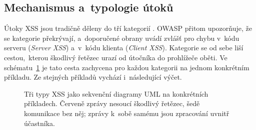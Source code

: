 \subsection{Mechanismus a~typologie útoků}

Útoky XSS jsou tradičně děleny do tří kategorií \parencite{owaspTypesXSS}. OWASP přitom upozorňuje, že se kategorie překrývají, a~doporučené obrany uvádí zvlášť pro chybu v~kódu serveru (\emph{Server XSS}) a~v~kódu klienta (\emph{Client XSS}). Kategorie se od sebe liší cestou,~kterou škodlivý řetězec urazí od útočníka do prohlížeče oběti. Ve schématu~\ref{fig:xss-typy} je tato cesta zachycena pro každou kategorii na jednom konkrétním příkladu. Ze stejných příkladů vychází i~následující výčet.

\begin{figure}[!htb]
    \centering
    \caption[Tři typy XSS jako sekvenční diagramy]{Tři typy XSS jako sekvenční diagramy UML na konkrétních příkladech. Červeně zprávy nesoucí škodlivý řetězec, šedě komunikace bez něj; zprávy k~sobě samému jsou zpracování uvnitř účastníka.}
    \label{fig:xss-typy}
\end{figure}

